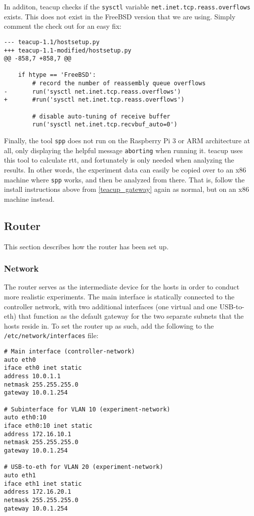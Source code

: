 In additon, \gls{teacup} checks if the \lstinline{sysctl} variable \lstinline{net.inet.tcp.reass.overflows} exists. This does not exist in the FreeBSD version that we are using. Simply comment the check out for an easy fix:

\begin{verbatim}
--- teacup-1.1/hostsetup.py
+++ teacup-1.1-modified/hostsetup.py
@@ -858,7 +858,7 @@

    if htype == 'FreeBSD':
        # record the number of reassembly queue overflows
-       run('sysctl net.inet.tcp.reass.overflows')
+       #run('sysctl net.inet.tcp.reass.overflows')

        # disable auto-tuning of receive buffer
        run('sysctl net.inet.tcp.recvbuf_auto=0')
\end{verbatim}

Finally, the tool \lstinline{spp} does not run on the Raspberry Pi 3 or ARM architecture at all, only displaying the helpful message \lstinline{aborting} when running it. \gls{teacup} uses this tool to calculate \gls{rtt}, and fortunately is only needed when analyzing the results. In other words, the experiment data can easily be copied over to an x86 machine where \lstinline{spp} works, and then be analyzed from there. That is, follow the install instructions above from \ref{teacup_gateway} again as normal, but on an x86 machine instead.






\subsection{Router}

This section describes how the router has been set up. 

\subsubsection{Network}

The router serves as the intermediate device for the hosts in order to conduct more realistic experiments. The main interface is statically connected to the controller network, with two additional interfaces (one virtual and one USB-to-eth) that function as the default gateway for the two separate subnets that the hosts reside in. To set the router up as such, add the following to the \lstinline{/etc/network/interfaces} file:

\begin{verbatim}
# Main interface (controller-network)
auto eth0
iface eth0 inet static
address 10.0.1.1
netmask 255.255.255.0
gateway 10.0.1.254

# Subinterface for VLAN 10 (experiment-network)
auto eth0:10
iface eth0:10 inet static
address 172.16.10.1
netmask 255.255.255.0
gateway 10.0.1.254

# USB-to-eth for VLAN 20 (experiment-network)
auto eth1
iface eth1 inet static
address 172.16.20.1
netmask 255.255.255.0
gateway 10.0.1.254
\end{verbatim}

